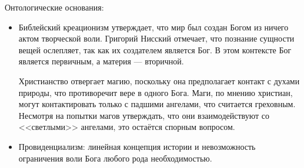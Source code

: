 
Онтологические основания:
\begin{itemize}
\item Библейский креационизм утверждает, что мир был создан Богом из ничего актом творческой воли. Григорий Нисский отмечает, что познание сущности вещей ослепляет, так как их создателем является Бог. В этом контексте Бог является первичным, а материя --- вторичной.

Христианство отвергает магию, поскольку она предполагает контакт с духами природы, что противоречит вере в одного Бога. Маги, по мнению христиан, могут контактировать только с падшими ангелами, что считается греховным. Несмотря на попытки магов утверждать, что они взаимодействуют со <<светлыми>> ангелами, это остаётся спорным вопросом.

\item Провиденциализм: линейная концепция истории и невозможность ограничения воли Бога любого рода необходимостью.
\end{itemize}

